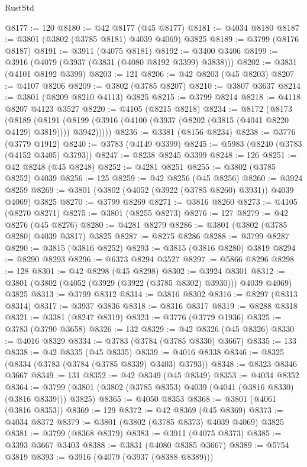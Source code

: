 \begin{lexlean}{RustStd}
\begin{coremodule}
@8177 := 120
@8180 := @42 @8177 (@45 @8177)
@8181 := @4034 @8180
@8187 := @3801 (@3802 (@3785 @8181) @4039 @4069) @3825
@8189 := @3799 (@8176 @8187)
@8191 := @3911 (@4075 @8181)
@8192 := @3400 @3406
@8199 := @3916 (@4079 (@3937 (@3831 (@4080 @8192 @3399) @3838)))
@8202 := @3831 (@4101 @8192 @3399)
@8203 := 121
@8206 := @42 @8203 (@45 @8203)
@8207 := @4107 @8206
@8209 := @3802 (@3785 @8207)
@8210 := @3807 @3637
@8214 := @3801 (@8209 @8210 @4113) @3825
@8215 := @3799 @8214
@8218 := @4118 @8207 @4123 @3527
@8220 := @4105 (@8215 @8218)
@8234 := @8172
    (@8173
      (@8189
        (@8191 (@8199 (@3916 (@4100 (@3937 (@8202 (@3815 (@4041 @8220 @4129) @3819)))) @3942)))))
@8236 := @3381 (@8156 @8234)
@8238 := @3776 (@3779 @1912)
@8240 := @3783 (@4149 @3399)
@8245 := @5983 (@8240 (@3783 (@4152 @3405) @3793))
@8247 := @8238 @8245 @3399
@8248 := 126
@8251 := @42 @8248 (@45 @8248)
@8252 := @4281 @8251
@8255 := @3802 (@3785 @8252) @4039
@8256 := 125
@8259 := @42 @8256 (@45 @8256)
@8260 := @3924 @8259
@8269 := @3801 (@3802 (@4052 (@3922 (@3785 @8260) @3931)) @4039 @4069) @3825
@8270 := @3799 @8269
@8271 := @3816 @8260
@8273 := @4105 (@8270 @8271)
@8275 := @3801 (@8255 @8273)
@8276 := 127
@8279 := @42 @8276 (@45 @8276)
@8280 := @4281 @8279
@8286 := @3801 (@3802 (@3785 @8280) @4039 @3817) @3825
@8287 := @8275 @8286
@8288 := @3799 @8287
@8290 := @3815 (@3816 @8252)
@8293 := @3815 (@3816 @8280) @3819
@8294 := @8290 @8293
@8296 := @6373 @8294 @3527
@8297 := @5866 @8296
@8298 := 128
@8301 := @42 @8298 (@45 @8298)
@8302 := @3924 @8301
@8312 := @3801 (@3802 (@4052 (@3929 (@3922 (@3785 @8302) @3930))) @4039 @4069) @3825
@8313 := @3799 @8312
@8314 := @3816 @8302
@8316 := @8297 (@8313 @8314)
@8317 := @3937 @3836
@8318 := @8316 @8317
@8319 := @8288 @8318
@8321 := @3381 (@8247 @8319)
@8323 := @3776 (@3779 @1936)
@8325 := @3783 (@3790 @3658)
@8326 := 132
@8329 := @42 @8326 (@45 @8326)
@8330 := @4016 @8329
@8334 := @3783 (@3784 (@3785 @8330) @3667)
@8335 := 133
@8338 := @42 @8335 (@45 @8335)
@8339 := @4016 @8338
@8346 := @8325 (@8334 (@3783 (@3784 (@3785 @8339) @3403) @3793))
@8348 := @8323 @8346 @3667
@8349 := 131
@8352 := @42 @8349 (@45 @8349)
@8353 := @4034 @8352
@8364 := @3799 (@3801 (@3802 (@3785 @8353) @4039 (@4041 (@3816 @8330) (@3816 @8339))) @3825)
@8365 := @4050 @8353
@8368 := @3801 (@4061 (@3816 @8353))
@8369 := 129
@8372 := @42 @8369 (@45 @8369)
@8373 := @4034 @8372
@8379 := @3801 (@3802 (@3785 @8373) @4039 @4069) @3825
@8381 := @3799 (@8368 @8379)
@8383 := @3911 (@4075 @8373)
@8385 := @3393 @3667 @3403
@8388 := @3831 (@4080 @8385 @3667)
@8389 := @5754 @3819
@8393 := @3916 (@4079 (@3937 (@8388 @8389)))

\end{coremodule}
\end{lexlean}
